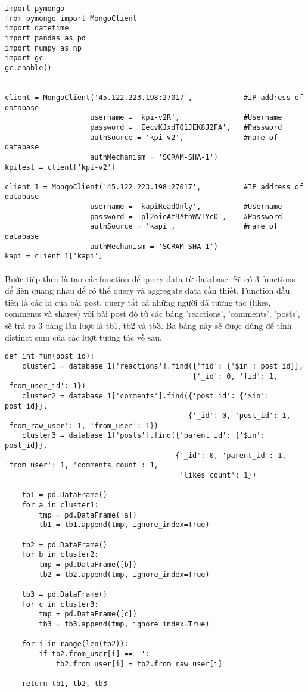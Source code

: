 \documentclass[12pt]{article}
\numberwithin{equation}{section}
\begin{document}
\begin{lstlisting}
import pymongo
from pymongo import MongoClient
import datetime
import pandas as pd
import numpy as np
import gc
gc.enable()


client = MongoClient('45.122.223.198:27017',            #IP address of database
                    username = 'kpi-v2R',          		#Username
                    password = 'EecvKJxdTQ1JEK8J2FA',   #Password
                    authSource = 'kpi-v2',              #name of database
                    authMechanism = 'SCRAM-SHA-1')
kpitest = client['kpi-v2']

client_1 = MongoClient('45.122.223.198:27017',          #IP address of database
                    username = 'kapiReadOnly',          #Username
                    password = 'pl2oieAt9#tnWV!Yc0',    #Password
                    authSource = 'kapi',                #name of database
                    authMechanism = 'SCRAM-SHA-1')
kapi = client_1['kapi']

\end{lstlisting}

\paragraph{} Bước tiếp theo là tạo các function để query data từ database. Sẽ có 3 functions để liên quang nhau để có thể query và aggregate data cần thiết. Function đầu tiên là các id của bài post, query tất cả những người đã tương tác (likes, comments và shares) với bài post đó từ các bảng 'reactions', 'comments', 'posts', sẽ trả ra 3 bảng lần lượt là tb1, tb2 và tb3. Ba bảng này sẽ được dùng để tính distinct sum của các lượt tương tác về sau.
\\

\begin{lstlisting}
def int_fun(post_id):
    cluster1 = database_1['reactions'].find({'fid': {'$in': post_id}},
                                            {'_id': 0, 'fid': 1, 'from_user_id': 1})
    cluster2 = database_1['comments'].find({'post_id': {'$in': post_id}},
                                           {'_id': 0, 'post_id': 1, 'from_raw_user': 1, 'from_user': 1})
    cluster3 = database_1['posts'].find({'parent_id': {'$in': post_id}},
                                        {'_id': 0, 'parent_id': 1, 'from_user': 1, 'comments_count': 1,
                                         'likes_count': 1})

    tb1 = pd.DataFrame()
    for a in cluster1:
        tmp = pd.DataFrame([a])
        tb1 = tb1.append(tmp, ignore_index=True)

    tb2 = pd.DataFrame()
    for b in cluster2:
        tmp = pd.DataFrame([b])
        tb2 = tb2.append(tmp, ignore_index=True)

    tb3 = pd.DataFrame()
    for c in cluster3:
        tmp = pd.DataFrame([c])
        tb3 = tb3.append(tmp, ignore_index=True)

    for i in range(len(tb2)):
        if tb2.from_user[i] == '':
            tb2.from_user[i] = tb2.from_raw_user[i]

    return tb1, tb2, tb3
\end{lstlisting}
\end{document}
